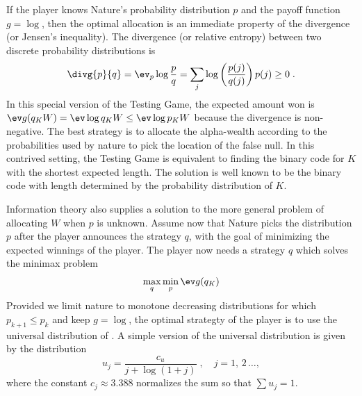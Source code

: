 \documentclass[12pt]{article}
\begin{document}
 If the player knows Nature's probability distribution $p$ and the payoff
 function $g = \log$, then the optimal allocation is an immediate property of
 the divergence (or Jensen's inequality).  The divergence (or relative entropy)
 between two discrete probability distributions is
 \begin{equation}
   \divg{p}{q} = \ev_p \log \frac{p}{q} 
               = \sum_j \log\left(\frac{p(j)}{q(j)}\right) p(j) \ge 0 \;.
 \label{eq:divg}
 \end{equation}
 In this special version of the Testing Game, the expected amount won is $\ev
 g(q_KW) = \ev \log q_K W \le \ev \log p_K W$ because the divergence is
 non-negative.  The best strategy is to allocate the alpha-wealth according to
 the probabilities used by nature to pick the location of the false null.  In
 this contrived setting, the Testing Game is equivalent to finding the binary
 code for $K$ with the shortest expected length.  The solution is well known to
 be the binary code with length determined by the probability distribution of
 $K$.  


 Information theory also supplies a solution to the more general problem of
 allocating $W$ when $p$ is unknown.  Assume now that Nature picks the
 distribution $p$ after the player announces the strategy $q$, with the goal of
 minimizing the expected winnings of the player.  The player now needs a
 strategy $q$ which solves the minimax problem
 \begin{equation}
   \max_q \min_p \ev g(q_K)   
 \label{eq:qopt}
 \end{equation}
 Provided we limit nature to monotone decreasing distributions for which
 $p_{k+1} \le p_k$ and keep $g = \log$, the optimal strategty of the player is
 to use the universal distribution of \citet{elias75, rissanen83}.  A simple
 version of the universal distribution is given by the distribution
 \begin{equation}
   u_j = \frac{c_u}{j + \log (1+j)} \;, \quad j = 1,\,2\, \ldots,
 \label{eq:univ}
 \end{equation}
 where the constant $c_j \approx 3.388$ normalizes the sum so that $\sum u_j = 1$.
\end{document}
